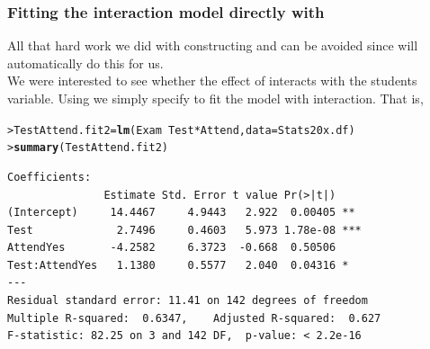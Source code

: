 \documentclass{beamer}\usepackage[]{graphicx}\usepackage[]{xcolor}
\makeatletter
\newcommand{\hlopt}[1]{\textcolor[rgb]{0,0,0}{#1}}%
\newcommand{\hlstd}[1]{\textcolor[rgb]{0.345,0.345,0.345}{#1}}%
\newcommand{\hlkwb}[1]{\textcolor[rgb]{0.69,0.353,0.396}{#1}}%
\newcommand{\hlkwc}[1]{\textcolor[rgb]{0.333,0.667,0.333}{#1}}%
\newcommand{\hlkwd}[1]{\textcolor[rgb]{0.737,0.353,0.396}{\textbf{#1}}}%
\newenvironment{kframe}{%
 \def\at@end@of@kframe{}%
 \ifinner\ifhmode%
  \def\at@end@of@kframe{\end{minipage}}%
  \begin{minipage}{\columnwidth}%
 \fi\fi%
 \def\FrameCommand##1{\hskip\@totalleftmargin \hskip-\fboxsep
 \colorbox{shadecolor}{##1}\hskip-\fboxsep
     \hskip-\linewidth \hskip-\@totalleftmargin \hskip\columnwidth}%
 \MakeFramed {\advance\hsize-\width
   \@totalleftmargin\z@ \linewidth\hsize
   \@setminipage}}%
 {\par\unskip\endMakeFramed%
 \at@end@of@kframe}
\newenvironment{knitrout}{}{} %
\makeatother
\begin{document}
\begin{frame}[fragile]
\frametitle{Fitting the interaction model directly with }
All that hard work we did with constructing  and  can be avoided
since  will automatically do this for us.\\
\bigskip
We were interested to see whether the effect of  interacts with the students  variable.
Using  we simply specify  to fit the model with interaction. That is,\\
\bigskip
\begin{knitrout}\scriptsize
{}\color{fgcolor}\begin{kframe}
\begin{alltt}
\hlstd{> }\hlstd{TestAttend.fit2}\hlkwb{=}\hlkwd{lm}\hlstd{(Exam}\hlopt{~}\hlstd{Test}\hlopt{*}\hlstd{Attend,} \hlkwc{data}\hlstd{=Stats20x.df)}
\hlstd{> }\hlkwd{summary}\hlstd{(TestAttend.fit2)}
\end{alltt}
\end{kframe}
\end{knitrout}
\begin{knitrout}\scriptsize
{}\color{fgcolor}\begin{kframe}
\begin{verbatim}
Coefficients:
               Estimate Std. Error t value Pr(>|t|)    
(Intercept)     14.4467     4.9443   2.922  0.00405 ** 
Test             2.7496     0.4603   5.973 1.78e-08 ***
AttendYes       -4.2582     6.3723  -0.668  0.50506    
Test:AttendYes   1.1380     0.5577   2.040  0.04316 *  
---
Residual standard error: 11.41 on 142 degrees of freedom
Multiple R-squared:  0.6347,	Adjusted R-squared:  0.627 
F-statistic: 82.25 on 3 and 142 DF,  p-value: < 2.2e-16
\end{verbatim}
\end{kframe}
\end{knitrout}
\end{frame}

\end{document}
